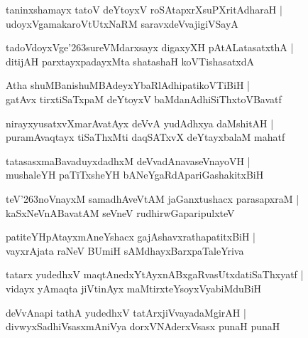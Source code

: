 \documentclass[twoside,12pt,openright]{book}
\def\S{\char'263}
\newcounter{shloka}[chapter]
\begin{document}
\begin{shloka}%
taninxshamayx tatoV deYtoyxV roSAtapxrXsuPXritAdharaH |\\
udoyxVgamakaroVtUtxNaRM saravxdeVvajigiVSayA 
\end{shloka}

\begin{shloka}%
tadoVdoyxVge\S sureVMdarxsayx digaxyXH pAtALatasatxthA |\\
ditijAH parxtayxpadayxMta shatashaH koVTishasatxdA 
\end{shloka}

\begin{shloka}%
Atha shuMBanishuMBAdeyxYbaRlAdhipatikoVTiBiH |\\
gatAvx tirxtiSaTxpaM deYtoyxV baMdanAdhiSiThxtoVBavatf 
\end{shloka}

\begin{shloka}%
nirayxyusatxvXmarAvatAyx deVvA yudAdhxya daMshitAH |\\
puramAvaqtayx tiSaThxMti daqSATxvX deYtayxbalaM mahatf 
\end{shloka}

\begin{shloka}%
tatasasxmaBavaduyxdadhxM deVvadAnavaseVnayoVH |\\
mushaleYH paTiTxsheYH bANeYgaRdApariGashakitxBiH 
\end{shloka}

\begin{shloka}%
teV\S noVnayxM samadhAveVtAM jaGanxtushacx parasapxraM |\\
kaSxNeVnABavatAM seVneV rudhirwGaparipulxteV 
\end{shloka}

\begin{shloka}%
patiteYHpAtayxmAneYshacx gajAshavxrathapatitxBiH |\\
vayxrAjata raNeV BUmiH sAMdhayxBarxpaTaleYriva 
\end{shloka}

\begin{shloka}%
tatarx yudedhxV maqtAnedxYtAyxnABxgaRvasUtxdatiSaThxyatf |\\
vidayx yAmaqta jiVtinAyx maMtirxteYsoyxVyabiMduBiH 
\end{shloka}

\begin{shloka}%
deVvAnapi tathA yudedhxV tatArxjiVvayadaMgirAH |\\
divwyxSadhiVsasxmAniVya dorxVNAderxVsasx punaH punaH 
\end{shloka}
\end{document}
